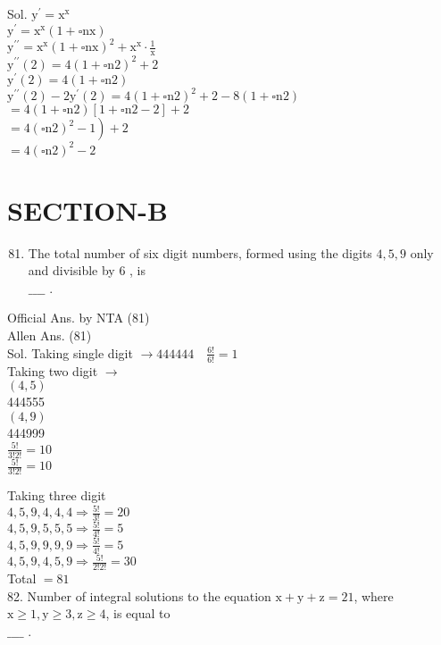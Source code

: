 \documentclass[10pt]{article}
\begin{document}
Sol. \(\mathrm{y}^{\prime}=\mathrm{x}^{\mathrm{x}}\)\\
\(\mathrm{y}^{\prime}=\mathrm{x}^{\mathrm{x}}(1+\square \mathrm{nx})\)\\
\(\mathrm{y}^{\prime \prime}=\mathrm{x}^{\mathrm{x}}(1+\square \mathrm{nx})^{2}+\mathrm{x}^{\mathrm{x}} \cdot \frac{1}{\mathrm{x}}\)\\
\(\mathrm{y}^{\prime \prime}(2)=4(1+\square \mathrm{n} 2)^{2}+2\)\\
\(\mathrm{y}^{\prime}(2)=4(1+\square \mathrm{n} 2)\)\\
\(\mathrm{y}^{\prime \prime}(2)-2 \mathrm{y}^{\prime}(2)=4(1+\square \mathrm{n} 2)^{2}+2-8(1+\square \mathrm{n} 2)\)\\
\(=4(1+\square \mathrm{n} 2)[1+\square \mathrm{n} 2-2]+2\)\\
\(\left.=4(\square \mathrm{n} 2)^{2}-1\right)+2\)\\
\(=4(\square \mathrm{n} 2)^{2}-2\)

\section*{SECTION-B}
\begin{enumerate}
  \setcounter{enumi}{80}
  \item The total number of six digit numbers, formed using the digits \(4,5,9\) only and divisible by 6 , is\\
\(\_\_\_\_\) .
\end{enumerate}

Official Ans. by NTA (81)\\
Allen Ans. (81)\\
Sol. Taking single digit \(\rightarrow 444444 \quad \frac{6!}{6!}=1\)\\
Taking two digit \(\rightarrow\)\\
\((4,5)\)\\
444555\\
\((4,9)\)\\
444999\\
\(\frac{5!}{3!2!}=10\)\\
\(\frac{5!}{3!2!}=10\)

Taking three digit\\
\(4,5,9,4,4,4 \Rightarrow \frac{5!}{3!}=20\)\\
\(4,5,9,5,5,5 \Rightarrow \frac{5!}{4!}=5\)\\
\(4,5,9,9,9,9 \Rightarrow \frac{5!}{4!}=5\)\\
\(4,5,9,4,5,9 \Rightarrow \frac{5!}{2!2!}=30\)\\
Total \(=81\)\\
82. Number of integral solutions to the equation \(\mathrm{x}+\mathrm{y}+\mathrm{z}=21\), where \(\mathrm{x} \geq 1, \mathrm{y} \geq 3, \mathrm{z} \geq 4\), is equal to\\
\(\_\_\_\_\) .
\end{document}
